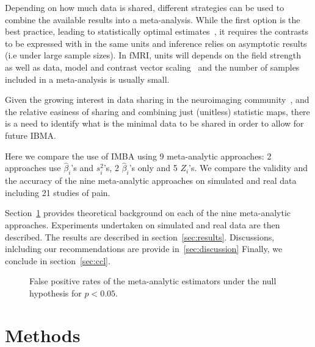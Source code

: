 \documentclass[preprint]{elsarticle}
\newcommand{\effectvector}{\hat\beta}
\newcommand{\effect}[1][i]{\effectvector_{#1}}
\newcommand{\vareffect}[1][i]{s^2_{#1}}
\newcommand{\zeffect}[1][\studyidx]{Z_{#1}}
\newcommand{\studyidx}{i}
\begin{document}
Depending on how much data is shared, different strategies can be used to combine the available results into a meta-analysis. While the first option is the best practice, leading to statistically optimal estimates~\cite{Cummings2004}, it requires the contrasts to be expressed with in the same units and inference relies on asymptotic results (i.e under large sample sizes). In fMRI, units will depends on the field strength~\cite{Chen2016} as well as data, model and contrast vector scaling~\cite{Nichols2012units} and the number of samples included in a meta-analysis is usually small.

Given the growing interest in data sharing in the neuroimaging community~\cite{Poldrack2014,Nichols2017}, and the relative easiness of sharing and combining just (unitless) statistic maps, there is a need to identify what is the minimal data to be shared in order to allow for future IBMA.

Here we compare the use of IMBA using 9 meta-analytic approaches: 2 approaches use $\effect$'s and $\vareffect$'s, 2 $\effect$'s only and 5 $\zeffect$'s. We compare the validity and the accuracy of the nine meta-analytic approaches on simulated and real data including 21 studies of pain.

Section~\ref{sec:methods} provides theoretical background on each of the nine meta-analytic approaches. Experiments undertaken on simulated and real data are then described. The results are described in section~\ref{sec:results}. Discussions, inlcluding our recommendations are provide in~\ref{sec:discussion} Finally, we conclude in section~\ref{sec:ccl}.

\begin{figure}[t]
	\centering
	\caption{False positive rates of the meta-analytic estimators under the null hypothesis for $p<0.05$.}
	\label{fig_fpr_all}
\end{figure}

\section{Methods}\label{sec:methods}

\end{document}
